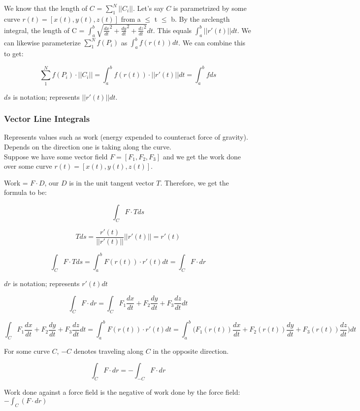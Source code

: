 \documentclass{article}
\begin{document}
We know that the length of $C$ = $\sum_{1}^{N} ||C_i||$. Let's say $C$ is parametrized by some curve $r(t) = [x(t), y(t), z(t)]$ from a $\leq$ t $\leq$ b. By the arclength integral, the length of C = $\int_{a}^{b}\sqrt{\frac{dx}{dt}^2 + \frac{dy}{dt}^2 + \frac{dz}{dt}^2} dt$. This equals $\int_{a}^{b}||r'(t)||dt$. We can likewise parameterize $\sum_{1}^{N} f(P_i)$ as $\int_{a}^{b} f(r(t))dt$. We can combine this to get:

$$
\sum_{1}^{N} f(P_i) \cdot ||C_i|| = \int_{a}^{b} f(r(t)) \cdot ||r'(t)|| dt = \int_{a}^{b} f ds
$$

$ds$ is notation; represents $||r'(t)|| dt$.

\subsubsection{Vector Line Integrals}

Represents values such as work (energy expended to counteract force of gravity). Depends on the direction one is taking along the curve. \\ 

Suppose we have some vector field $F = [F_1, F_2, F_3]$ and we get the work done over some curve $r(t) = [x(t), y(t), z(t)]$.

Work = $F \cdot D$, our $D$ is in the unit tangent vector $T$. Therefore, we get the formula to be:

$$
\int_{C}^{} F \cdot T ds
$$

$$
T ds = \frac{r'(t)}{||r'(t)||} ||r'(t)|| = r'(t)
$$

$$
\int_{C}^{} F \cdot T ds = \int_{a}^{b} F(r(t)) \cdot r'(t) dt = \int_{C}^{} F \cdot dr
$$

$dr$ is notation; represents $r'(t)dt$

$$
\int_{C}^{} F \cdot dr = \int_{C}^{} F_1 \frac{dx}{dt} + F_2 \frac{dy}{dt} + F_3 \frac{dz}{dt} dt
$$

$$
\int_{C}^{} F_1 \frac{dx}{dt} + F_2 \frac{dy}{dt} + F_3 \frac{dz}{dt} dt = \int_{a}^{b} F(r(t)) \cdot r'(t) dt = \int_{a}^{b} \biggl(F_1(r(t)) \frac{dx}{dt} + F_2(r(t)) \frac{dy}{dt} + F_3(r(t)) \frac{dz}{dt}\biggl) dt
$$

For some curve $C$, $-C$ denotes traveling along $C$ in the opposite direction.

$$
\int_{C}^{} F \cdot dr = -\int_{-C}^{} F \cdot dr
$$

Work done against a force field is the negative of work done by the force field: $-\int_{C}^{}(F \cdot dr)$
\end{document}
